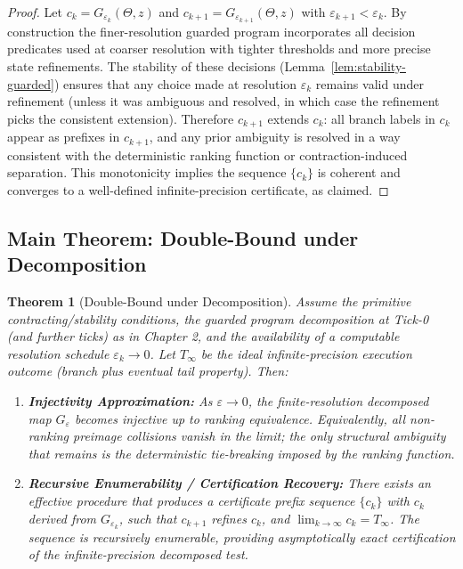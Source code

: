 \documentclass[12pt]{article}
\theoremstyle{definition}
\theoremstyle{plain}
\newtheorem{theorem}{Theorem}[section]
\begin{document}
\begin{proof}
Let \(c_k = G_{\varepsilon_k}(\Theta,z)\) and \(c_{k+1} = G_{\varepsilon_{k+1}}(\Theta,z)\) with \(\varepsilon_{k+1}<\varepsilon_k\). By construction the finer-resolution guarded program incorporates all decision predicates used at coarser resolution with tighter thresholds and more precise state refinements. The stability of these decisions (Lemma~\ref{lem:stability-guarded}) ensures that any choice made at resolution \(\varepsilon_k\) remains valid under refinement (unless it was ambiguous and resolved, in which case the refinement picks the consistent extension). Therefore \(c_{k+1}\) extends \(c_k\): all branch labels in \(c_k\) appear as prefixes in \(c_{k+1}\), and any prior ambiguity is resolved in a way consistent with the deterministic ranking function or contraction-induced separation. This monotonicity implies the sequence \(\{c_k\}\) is coherent and converges to a well-defined infinite-precision certificate, as claimed.
\end{proof}


\subsection{Main Theorem: Double-Bound under Decomposition}
\label{sub:dbd-main}

\begin{theorem}[Double-Bound under Decomposition]
\label{thm:double-bound-decomp}
Assume the primitive contracting/stability conditions, the guarded program decomposition at Tick-0 (and further ticks) as in Chapter 2, and the availability of a computable resolution schedule \(\varepsilon_k\to0\). Let \(T_\infty\) be the ideal infinite-precision execution outcome (branch plus eventual tail property). Then:

\begin{enumerate}[label=(\alph*)]
  \item \textbf{Injectivity Approximation:} As \(\varepsilon\to0\), the finite-resolution decomposed map \(G_\varepsilon\) becomes injective up to ranking equivalence. Equivalently, all non-ranking preimage collisions vanish in the limit; the only structural ambiguity that remains is the deterministic tie-breaking imposed by the ranking function.  
  \item \textbf{Recursive Enumerability / Certification Recovery:} There exists an effective procedure that produces a certificate prefix sequence \(\{c_k\}\) with \(c_k\) derived from \(G_{\varepsilon_k}\), such that \(c_{k+1}\) refines \(c_k\), and \(\lim_{k\to\infty} c_k = T_\infty\). The sequence is recursively enumerable, providing asymptotically exact certification of the infinite-precision decomposed test.
\end{enumerate}
\end{theorem}
\end{document}
